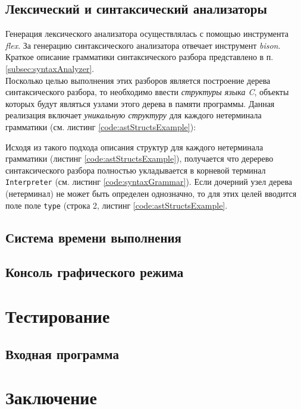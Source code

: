 \documentclass[12pt]{article}
\begin{document}
		\subsection{Лексический и синтаксический анализаторы}
			\hspace{\parindent}Генерация лексического анализатора осуществлялась с помощью инструмента {\it flex}.
			\indent За генерацию синтаксического анализатора отвечает инструмент {\it bison}. Краткое описание грамматики синтаксического разбора представлено в п. \ref{subsec:syntaxAnalyzer}. \\
			\indent Посколько целью выполнения этих разборов является построение дерева синтаксического разбора, то необходимо ввести {\it структуры языка C}, объекты которых будут являться узлами этого дерева в памяти программы. Данная реализация включает {\it уникальную структуру} для каждого нетерминала грамматики (см. листинг \ref{code:astStructsExample}):
			
			
			\indent Исходя из такого подхода описания структур для каждого нетерминала грамматики (листинг \ref{code:astStructsExample}), получается что деререво синтаксического разбора полностью укладывается в корневой терминал {\tt Interpreter} (см. листинг \ref{code:syntaxGrammar}). Если дочерний узел дерева (нетерминал) не может быть определен однозначно, то для этих целей вводится поле поле {\tt type} (строка 2, листинг \ref{code:astStructsExample}. 
		\subsection{Система времени выполнения}
		\subsection{Консоль графического режима}
	\newpage
	\section{Тестирование}
		\subsection{Входная программа}
	\newpage	
	\section{Заключение}
	\newpage
	\nocite{*}
			
	
	
	\newpage
	\tableofcontents %

\end{document}
